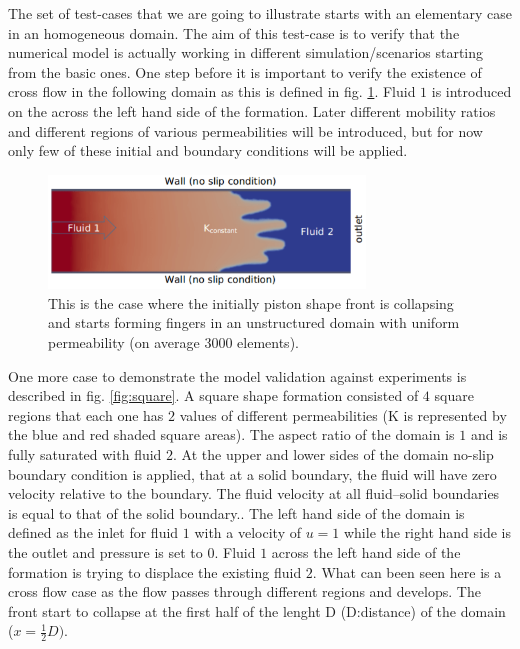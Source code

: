 \documentclass[preprint,authoryear,12pt]{elsarticle}
\begin{document}
The set of test-cases that we are going to illustrate starts with an elementary case in an homogeneous domain. The aim of this test-case is to verify that the numerical model is actually working in different simulation/scenarios starting from the basic ones. One step before it is important to verify the existence of cross flow in the following domain as this is defined in fig. \ref{fig:simple_case}. Fluid $1$ is introduced on the  across the left hand side of the formation. Later different mobility ratios and different regions of various permeabilities will be introduced, but for now only few of these initial and boundary conditions will be applied. 

\begin{figure}[h]
\begin{center}
\includegraphics[width=0.75\textwidth]{./Pics/phase_vol_frac_uni_perm_1.pdf}
\caption{This is the case where the initially piston shape front is collapsing and starts forming fingers in an unstructured domain with uniform permeability (on average 3000 elements).}
\label{fig:simple_case}
\end{center}
\end{figure}

\noindent One more case to demonstrate the model validation against experiments is described in fig. \ref{fig:square}. A square shape formation consisted of $4$ square regions that each one has $2$ values of different permeabilities (K is represented by the blue and red shaded square areas). The aspect ratio of the domain is $1$ and is fully saturated with fluid $2$. At the upper and lower sides of the domain no-slip boundary condition is applied, that at a solid boundary, the fluid will have zero velocity relative to the boundary. The fluid velocity at all fluid–solid boundaries is equal to that of the solid boundary.. The left hand side of the domain is defined as the inlet for fluid $1$ with a velocity of $u=1$ while the right hand side is the outlet and pressure is set to $0$. Fluid $1$ across the left hand side of the formation is trying to displace the existing fluid $2$. What can been seen here is a cross flow case as the flow passes through different regions and develops. The front start to collapse at the first half of the lenght D (D:distance) of the domain ($x= \frac{1}{2} D)$.
\end{document}
